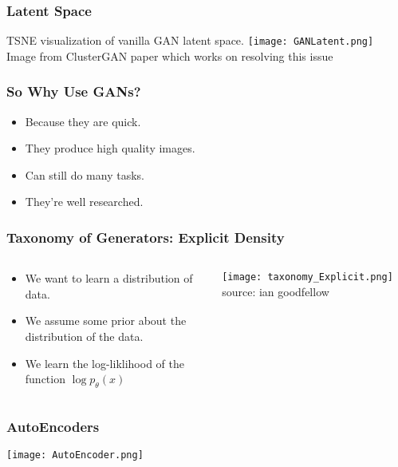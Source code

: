 \begin{frame}
    \frametitle{Latent Space}
    \vspace{-1.25em}
    \center\footnotesize{TSNE visualization of vanilla GAN latent space. }
    \center\texttt{[image: GANLatent.png]}
    \\
    \tiny{Image from ClusterGAN paper which works on resolving this
    issue}
\end{frame}

\begin{frame}
    \frametitle{So Why Use GANs?}
    \begin{itemize}
        \item Because they are quick.
        \item They produce high quality images.
        \item Can still do many tasks.
        \item They're well researched.
    \end{itemize}
\end{frame}

\begin{frame}
    \frametitle{Taxonomy of Generators: Explicit Density}
    \begin{columns}
        \begin{column}{0.48\paperwidth}
            \begin{itemize}
                \item We want to learn a distribution of
                    data. 
                \item We assume some prior about the distribution of the data. 
                \item We learn the log-liklihood of the function $\log
                    p_\theta(x)$
            \end{itemize}
        \end{column}
        \begin{column}{0.48\paperwidth}
            \texttt{[image: taxonomy\_Explicit.png]}
            \null\hfill \tiny{source: ian goodfellow}
        \end{column}
    \end{columns}
\end{frame}

\begin{frame}
    \frametitle{AutoEncoders}
    \texttt{[image: AutoEncoder.png]}
\end{frame}


